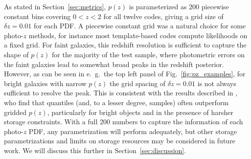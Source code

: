 As stated in Section~\ref{sec:metrics}, $p(z)$ is parameterized as $200$ piecewise constant bins covering $0<z<2$ for all twelve codes, giving a grid size of $\delta z = 0.01$ for each PDF.
A piecewise constant grid was a natural choice for some photo-$z$ methods, for instance most template-based codes compute likelihoods on a fixed grid.  %
For faint galaxies, this redshift resolution is sufficient to capture the shape of $p(z)$ for the majority of the test sample, where photometric errors on the faint galaxies lead to somewhat broad peaks in the redshift posterior.
However, as can be seen in e.~g.~the top left panel of Fig.~\ref{fig:pz_examples}, for bright galaxies with narrow $p(z)$ the grid spacing of $\delta z = 0.01$ is not always sufficient to resolve the peak.
This is consistent with the results described in \citet[]{Malz:qp}, who find that quantiles (and, to a lesser degree, samples) often outperform gridded $p(z)$, particularly for bright objects and in the presence of harsher storage constraints.
With a full 200 numbers to capture the information of each photo-$z$ PDF, any parametrization will perform adequately, but other storage parametrizations and limits on storage resources may be considered in future work.
We will discuss this further in Section~\ref{sec:discussion}.

